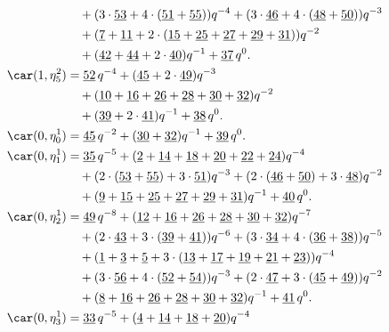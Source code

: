 \begin{align*}
	&\quad+(3\cdot\underline{53}+4\cdot(\underline{51}+\underline{55}))q^{-4}+(3\cdot\underline{46}+4\cdot(\underline{48}+\underline{50}))q^{-3}\\
	&\quad+(\underline{7}+\underline{11}+2\cdot(\underline{15}+\underline{25}+\underline{27}+\underline{29}+\underline{31}))q^{-2}\\
	&\quad+(\underline{42}+\underline{44}+2\cdot\underline{40})q^{-1}+\underline{37}\,q^0.\\
	\car(1,\eta^{2}_{5})
	&=\underline{52}\,q^{-4}+(\underline{45}+2\cdot\underline{49})q^{-3}\\
	&\quad+(\underline{10}+\underline{16}+\underline{26}+\underline{28}+\underline{30}+\underline{32})q^{-2}\\
	&\quad+(\underline{39}+2\cdot\underline{41})q^{-1}+\underline{38}\,q^0.\\
	\car(0,\eta^{1}_{0})
	&=\underline{45}\,q^{-2}+(\underline{30}+\underline{32})q^{-1}+\underline{39}\,q^0.\\
	\car(0,\eta^{1}_{1})
	&=\underline{35}\,q^{-5}+(\underline{2}+\underline{14}+\underline{18}+\underline{20}+\underline{22}+\underline{24})q^{-4}\\
	&\quad+(2\cdot(\underline{53}+\underline{55})+3\cdot\underline{51})q^{-3}+(2\cdot(\underline{46}+\underline{50})+3\cdot\underline{48})q^{-2}\\
	&\quad+(\underline{9}+\underline{15}+\underline{25}+\underline{27}+\underline{29}+\underline{31})q^{-1}+\underline{40}\,q^0.\\
	\car(0,\eta^{1}_{2})
	&=\underline{49}\,q^{-8}+(\underline{12}+\underline{16}+\underline{26}+\underline{28}+\underline{30}+\underline{32})q^{-7}\\
	&\quad+(2\cdot\underline{43}+3\cdot(\underline{39}+\underline{41}))q^{-6}+(3\cdot\underline{34}+4\cdot(\underline{36}+\underline{38}))q^{-5}\\
	&\quad+(\underline{1}+\underline{3}+\underline{5}+3\cdot(\underline{13}+\underline{17}+\underline{19}+\underline{21}+\underline{23}))q^{-4}\\
	&\quad+(3\cdot\underline{56}+4\cdot(\underline{52}+\underline{54}))q^{-3}+(2\cdot\underline{47}+3\cdot(\underline{45}+\underline{49}))q^{-2}\\
	&\quad+(\underline{8}+\underline{16}+\underline{26}+\underline{28}+\underline{30}+\underline{32})q^{-1}+\underline{41}\,q^0.\\
	\car(0,\eta^{1}_{3})
	&=\underline{33}\,q^{-5}+(\underline{4}+\underline{14}+\underline{18}+\underline{20})q^{-4}\\

\end{align*}
